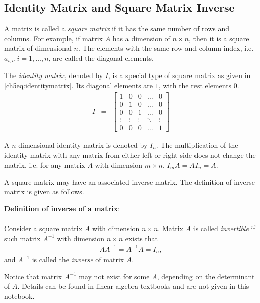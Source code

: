 \subsection{Identity Matrix and Square Matrix Inverse}

A matrix is called a \textit{square matrix} if it has the same number of rows and columns. For example, if matrix $A$ has a dimension of $n\times n$, then it is a square matrix of dimensional $n$. The elements with the same row and column index, i.e. $a_{i,i}, i=1, \ldots, n$, are called the diagonal elements.

The \textit{identity matrix}, denoted by $I$, is a special type of square matrix as given in \eqref{ch5eq:identitymatrix}. Its diagonal elements are $1$, with the rest elements $0$. 
\begin{eqnarray}
    I &=& \left[\begin{array}{ccccc}
        1 & 0 & 0 & \ldots & 0 \\
        0 & 1 & 0 & \ldots & 0 \\
        0 & 0 & 1 & \ldots & 0 \\
        \vdots & \vdots & \vdots & \ddots & \vdots \\
        0 & 0 & 0 & \ldots & 1
    \end{array}\right] \label{ch5eq:identitymatrix}
\end{eqnarray}

A $n$ dimensional identity matrix is denoted by $I_n$. The multiplication of the identity matrix with any matrix from either left or right side does not change the matrix, i.e. for any matrix $A$ with dimension $m\times n$, $I_{m}A = AI_{n}=A$.

A square matrix may have an associated inverse matrix. The definition of inverse matrix is given as follows.

\begin{VF}
\textbf{Definition of inverse of a matrix}:
\\
\\
Consider a square matrix $A$ with dimension $n\times n$. Matrix $A$ is called \textit{invertible} if such matrix $A^{-1}$ with dimension $n\times n$ exists that
\begin{eqnarray}
    AA^{-1} = A^{-1}A = I_n, \nonumber
\end{eqnarray}
and $A^{-1}$ is called the \textit{inverse} of matrix $A$.

\end{VF}

Notice that matrix $A^{-1}$ may not exist for some $A$, depending on the determinant of $A$. Details can be found in linear algebra textbooks and are not given in this notebook.

